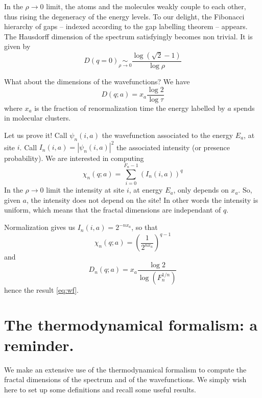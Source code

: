 \documentclass[11pt]{article}
\numberwithin{equation}{section}
\newcommand{\simlim}[2]{\ensuremath{ \underset{#1 \rightarrow #2}{\sim} }}
\begin{document}
In the $\rho \rightarrow 0$ limit, the atoms and the molecules weakly couple to each other, thus rising the degeneracy of the energy levels. To our delight, the Fibonacci hierarchy of gaps -- indexed according to the gap labelling theorem -- appears.
The Hausdorff dimension of the spectrum satisfyingly becomes non trivial. It is given by
\begin{equation}
\label{eq:haus}
	D(q=0) \simlim{\rho}{0} \frac{\log( \sqrt{2} - 1 )}{\log \rho}
\end{equation}



What about the dimensions of the wavefunctions?
We have
\begin{equation}
\label{eq:wf}
	D(q;a) = x_a \frac{\log 2}{\log \tau}
\end{equation}
where $x_a$ is the fraction of renormalization time the energy labelled by $a$ spends in molecular clusters.

Let us prove it!
Call $\psi_n(i,a)$ the wavefunction associated to the energy $E_a$, at site $i$. Call $I_n(i,a) = |\psi_n(i,a)|^2$ the associated intensity (or presence probability).
We are interested in computing
\begin{equation}
	\chi_n(q;a) = \sum_{i=0}^{F_n - 1} (I_n(i,a))^q
\end{equation}
In the $\rho \rightarrow 0$ limit the intensity at site $i$, at energy $E_a$, only depends on $x_a$. So, given $a$, the intensity does not depend on the site! In other words the intensity is uniform, which means that the fractal dimensions are independant of $q$.

Normalization gives us $I_n(i,a) = 2^{-nx_a}$, so that
\begin{equation}
	\chi_n(q;a) = \left( \frac{1}{2^{n x_a}} \right)^{q-1}
\end{equation}
and
\begin{equation}
	D_n(q;a) = x_a \frac{\log 2}{\log( F_n^{1/n} )}
\end{equation}
hence the result \eqref{eq:wf}.

\newpage
\appendix

\section{The thermodynamical formalism: a reminder.}
\label{app:thermo}

We make an extensive use of the thermodynamical formalism to compute the fractal dimensions of the spectrum and of the wavefunctions. We simply wish here to set up some definitions and recall some useful results.
\end{document}
